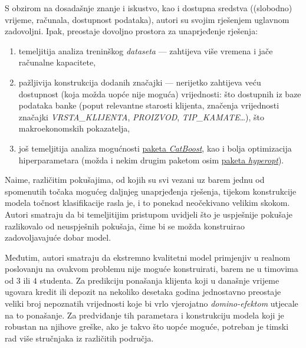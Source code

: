 \documentclass[paper = a4, fontsize = 11pt, DIV = 12, BCOR = 0pt, headings = standardclasses, numbers = endperiod]{scrartcl}
\begin{document}
	\par


	S obzirom na dosadašnje znanje i iskustvo, kao i dostupna sredstva ((slobodno) vrijeme, računala, dostupnost podataka), autori su svojim rješenjem uglavnom zadovoljni. Ipak, preostaje dovoljno prostora za unaprjeđenje rješenja:
	\begin{enumerate}
		\item temeljitija analiza treninškog \emph{dataseta} --- zahtijeva više vremena i jače računalne kapacitete,
		\item pažljivija konstrukcija dodanih značajki --- nerijetko zahtijeva veću dostupnost (koja možda uopće nije moguća) vrijednosti: što dostupnih iz baze podataka banke (poput relevantne starosti klijenta, značenja vrijednosti značajki \emph{VRSTA\_KLIJENTA}, \emph{PROIZVOD}, {\emph{TIP\_KAMATE}}{\ldots}), što makroekonomskih pokazatelja,
		\item još temeljitija analiza mogućnosti \href{http://catboost.ai}{paketa \emph{CatBoost}}, kao i bolja optimizacija hiperparametara (možda i nekim drugim paketom osim \href{http://hyperopt.github.io/hyperopt/}{paketa \emph{hyperopt}}).
	\end{enumerate}
	Naime, različitim pokušajima, od kojih su svi vezani uz barem jednu od spomenutih točaka mogućeg daljnjeg unaprjeđenja rješenja, tijekom konstrukcije modela točnost klasifikacije rasla je, i to ponekad neočekivano velikim skokom. Autori smatraju da bi temeljitijim pristupom uvidjeli što je uspješnije pokušaje razlikovalo od neuspješnih pokušaja, čime bi se možda konstruirao zadovoljavajuće dobar model.

	\par

	Međutim, autori smatraju da ekstremno kvalitetni model primjenjiv u realnom poslovanju na ovakvom problemu nije moguće konstruirati, barem ne u timovima od $ 3 $ ili $ 4 $ studenta. Za predikciju ponašanja klijenta koji u današnje vrijeme ugovara kredit ili depozit na nekoliko desetaka godina jednostavno preostaje veliki broj nepoznatih vrijednosti koje bi vrlo vjerojatno \emph{domino-efektom} utjecale na to ponašanje. Za predviđanje tih parametara i konstrukciju modela koji je robustan na njihove greške, ako je takvo što uopće moguće, potreban je timski rad više stručnjaka iz različitih područja.

	\par
\end{document}
